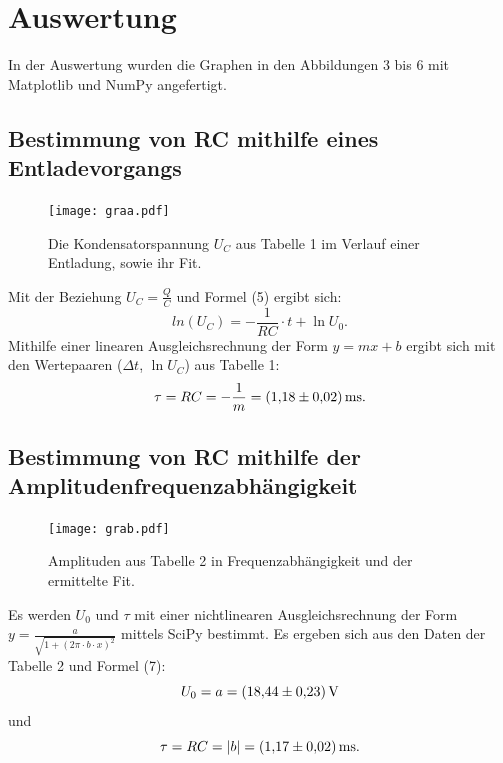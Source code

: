 \section{Auswertung}
\label{sec:Auswertung}
In der Auswertung wurden die Graphen in den Abbildungen 3 bis 6 mit Matplotlib \cite{matplotlib} und NumPy \cite{numpy} angefertigt.

\subsection{Bestimmung von RC mithilfe eines Entladevorgangs}
\begin{figure}[H]
	\centering
	\caption{Die Kondensatorspannung $U_C$ aus Tabelle 1 im Verlauf einer Entladung, sowie ihr Fit.}
	\texttt{[image: graa.pdf]}
	\label{fig:graa}
\end{figure}


Mit der Beziehung $U_C = \frac{Q}{C}$ und Formel (5) ergibt sich:
\begin{displaymath}
ln(U_C) = -\frac{1}{RC}\cdot t + \ln U_0\text{.}
\end{displaymath}
Mithilfe einer linearen Ausgleichsrechnung der Form $y = mx+b$ ergibt sich mit den Wertepaaren ($\Delta t$, $\ln U_C$) aus Tabelle 1:
\begin{displaymath}
\tau = RC = -\frac{1}{m} = \SI{1.18 \pm 0.02}{\milli\second}\text{.}
\end{displaymath}
\subsection{Bestimmung von RC mithilfe der Amplitudenfrequenzabhängigkeit}
\begin{figure}[H]
	\centering
	\caption{Amplituden aus Tabelle 2 in Frequenzabhängigkeit und der ermittelte Fit.}
	\texttt{[image: grab.pdf]}
	\label{fig:grab}
\end{figure}

Es werden $U_0$ und $\tau$ mit einer nichtlinearen Ausgleichsrechnung der Form $y = \frac{a}{\sqrt{1+(2\pi \cdot b\cdot x)^2}}$ mittels SciPy \cite{scipy} bestimmt. Es ergeben sich aus den Daten der Tabelle 2 und Formel (7):
\begin{displaymath}
U_0 = a = \SI{18.44 \pm 0.23}{\volt}
\end{displaymath}
und
\begin{displaymath}
\tau = RC = |b| = \SI{1.17 \pm 0.02}{\milli\second}\text{.}
\end{displaymath}

